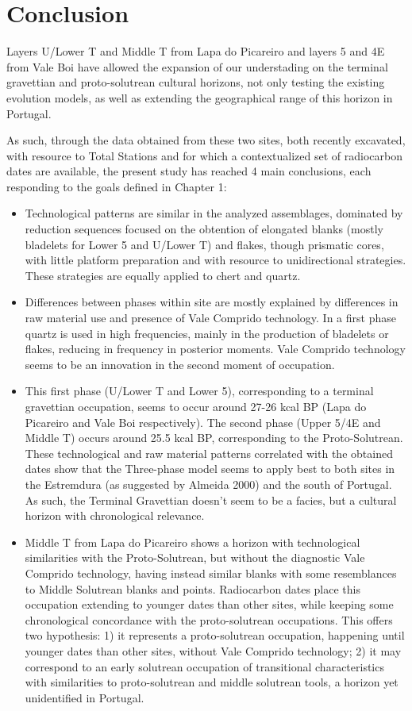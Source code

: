 \documentclass[12pt,twoside]{reedthesis}
\begin{document}
\hypertarget{conclusion}{%
\chapter{Conclusion}\label{conclusion}}

Layers U/Lower T and Middle T from Lapa do Picareiro and layers 5 and 4E from Vale Boi have allowed the expansion of our understading on the terminal gravettian and proto-solutrean cultural horizons, not only testing the existing evolution models, as well as extending the geographical range of this horizon in Portugal.

As such, through the data obtained from these two sites, both recently excavated, with resource to Total Stations and for which a contextualized set of radiocarbon dates are available, the present study has reached 4 main conclusions, each responding to the goals defined in Chapter 1:
\begin{itemize}
\item
  Technological patterns are similar in the analyzed assemblages, dominated by reduction sequences focused on the obtention of elongated blanks (mostly bladelets for Lower 5 and U/Lower T) and flakes, though prismatic cores, with little platform preparation and with resource to unidirectional strategies. These strategies are equally applied to chert and quartz.
\item
  Differences between phases within site are mostly explained by differences in raw material use and presence of Vale Comprido technology. In a first phase quartz is used in high frequencies, mainly in the production of bladelets or flakes, reducing in frequency in posterior moments. Vale Comprido technology seems to be an innovation in the second moment of occupation.
\item
  This first phase (U/Lower T and Lower 5), corresponding to a terminal gravettian occupation, seems to occur around 27-26 kcal BP (Lapa do Picareiro and Vale Boi respectively). The second phase (Upper 5/4E and Middle T) occurs around 25.5 kcal BP, corresponding to the Proto-Solutrean. These technological and raw material patterns correlated with the obtained dates show that the Three-phase model seems to apply best to both sites in the Estremdura (as suggested by Almeida 2000) and the south of Portugal. As such, the Terminal Gravettian doesn't seem to be a facies, but a cultural horizon with chronological relevance.
\item
  Middle T from Lapa do Picareiro shows a horizon with technological similarities with the Proto-Solutrean, but without the diagnostic Vale Comprido technology, having instead similar blanks with some resemblances to Middle Solutrean blanks and points. Radiocarbon dates place this occupation extending to younger dates than other sites, while keeping some chronological concordance with the proto-solutrean occupations. This offers two hypothesis: 1) it represents a proto-solutrean occupation, happening until younger dates than other sites, without Vale Comprido technology; 2) it may correspond to an early solutrean occupation of transitional characteristics with similarities to proto-solutrean and middle solutrean tools, a horizon yet unidentified in Portugal.
\end{itemize}
\end{document}
